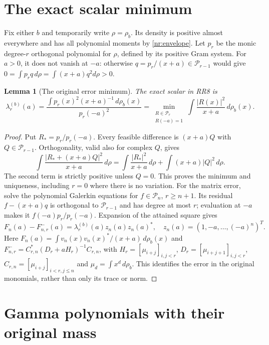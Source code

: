 \documentclass[11pt]{article}
\newtheorem{lemma}[theorem]{Lemma}
\newcommand{\R}{\mathbb R}
\newcommand{\Pcal}{\mathcal P}
\begin{document}
\section{The exact scalar minimum}

Fix either $b$ and temporarily write $\rho=\rho_b$.
Its density is positive almost everywhere and has all polynomial
moments by \eqref{nr:envelope}. Let $p_r$ be the monic degree-$r$
orthogonal polynomial for $\rho$, defined by its positive Gram system.
For $a>0$, it does not vanish at $-a$: otherwise
$q=p_r/(x+a)\in\Pcal_{r-1}$ would give
$0=\int p_rq\,d\rho=\int(x+a)q^2d\rho>0$.

\begin{lemma}[The original error minimum]
The exact scalar in RR8 is
\begin{equation}\tag{NR6}\label{nr:min}
 \lambda_r^{(b)}(a)
 =\frac{\displaystyle\int p_r(x)^2(x+a)^{-1}\,d\rho_b(x)}{p_r(-a)^2}
 =\min_{\substack{R\in\Pcal_r\\R(-a)=1}}
       \int\frac{|R(x)|^2}{x+a}\,d\rho_b(x).
\end{equation}
\end{lemma}
\begin{proof}
Put $R_*=p_r/p_r(-a)$. Every feasible difference is $(x+a)Q$ with
$Q\in\Pcal_{r-1}$. Orthogonality, valid also for complex $Q$, gives
\[
 \int\frac{|R_*+(x+a)Q|^2}{x+a}\,d\rho
 =\int\frac{|R_*|^2}{x+a}\,d\rho
    +\int(x+a)|Q|^2\,d\rho.
\]
The second term is strictly positive unless $Q=0$. This proves the
minimum and uniqueness, including $r=0$ where there is no variation.
For the matrix error, solve the polynomial Galerkin equations for
$f\in\Pcal_n$, $r\ge n+1$. Its residual $f-(x+a)q$ is orthogonal
to $\Pcal_{r-1}$ and has degree at most $r$; evaluation at $-a$ makes
it $f(-a)p_r/p_r(-a)$. Expansion of the attained square gives
\begin{equation}\tag{NR7}\label{nr:rankone}
 F_n(a)-F^-_{n,r}(a)=\lambda_r^{(b)}(a)z_n(a)z_n(a)^*,
 \quad z_n(a)=(1,-a,\ldots,(-a)^n)^T.
\end{equation}
Here $F_n(a)=\int v_n(x)v_n(x)^*/(x+a)\,d\rho_b(x)$ and
$F^-_{n,r}=C_{r,n}^*(D_r+aH_r)^{-1}C_{r,n}$, with
$H_r=[\mu_{i+j}]_{i,j<r}$, $D_r=[\mu_{i+j+1}]_{i,j<r}$,
$C_{r,n}=[\mu_{i+j}]_{i<r,j\le n}$ and
$\mu_d=\int x^d\,d\rho_b$. This identifies the error in the original
monomials, rather than only its trace or norm.
\end{proof}

\section{Gamma polynomials with their original mass}
\end{document}
